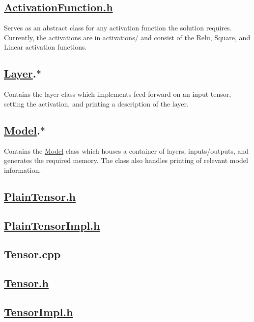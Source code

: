 \subsection*{\hyperlink{ActivationFunction_8h_source}{Activation\+Function.\+h}}

Serves as an abstract class for any activation function the solution requires. Currently, the activations are in activations/ and consist of the Relu, Square, and Linear activation functions.

\subsection*{\hyperlink{classLayer}{Layer}.$\ast$}

Contains the layer class which implements feed-\/forward on an input tensor, setting the activation, and printing a description of the layer.

\subsection*{\hyperlink{classModel}{Model}.$\ast$}

Contains the \hyperlink{classModel}{Model} class which houses a container of layers, inputs/outputs, and generates the required memory. The class also handles printing of relevant model information.

\subsection*{\hyperlink{PlainTensor_8h_source}{Plain\+Tensor.\+h}}

\subsection*{\hyperlink{PlainTensorImpl_8h_source}{Plain\+Tensor\+Impl.\+h}}

\subsection*{Tensor.\+cpp}

\subsection*{\hyperlink{Tensor_8h_source}{Tensor.\+h}}

\subsection*{\hyperlink{TensorImpl_8h_source}{Tensor\+Impl.\+h}}